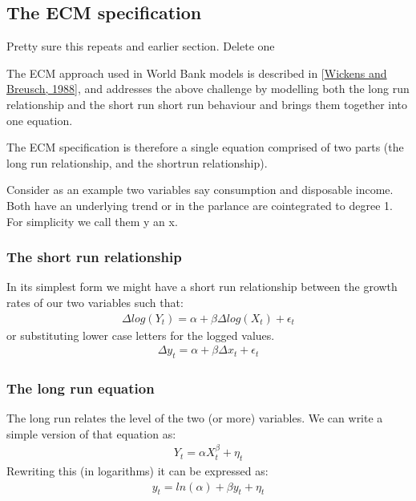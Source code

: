 \documentclass[letterpaper,10pt,english]{jupyterBook}
\begin{document}
\subsection{The ECM specification}
\label{\detokenize{content/06_WBModels/LoadingWBModel:the-ecm-specification}}
\sphinxAtStartPar
 Pretty sure this repeats and earlier section.  Delete one 

\sphinxAtStartPar
The ECM approach used in World Bank models is described in {[}\hyperlink{cite.content/99_BackMatter/References:id16}{Wickens and Breusch, 1988}{]}, and addresses the above challenge by modelling both the long run relationship and the short run short run behaviour and brings them together into one equation.

\sphinxAtStartPar
The ECM specification is therefore a single equation comprised of two parts (the long run relationship, and the short\sphinxhyphen{}run relationship).

\sphinxAtStartPar
Consider as an example two variables say consumption and disposable income.  Both have an underlying trend or in the parlance are co\sphinxhyphen{}integrated to degree 1.  For simplicity we call them y an x.


\subsubsection{The short run relationship}
\label{\detokenize{content/06_WBModels/LoadingWBModel:the-short-run-relationship}}
\sphinxAtStartPar
In its simplest form we might have a short run relationship between the growth rates of our two variables such that:
\begin{equation*}
\begin{split}\Delta log(Y_t) = \alpha + \beta \Delta log(X_t) +\epsilon_t\end{split}
\end{equation*}
\sphinxAtStartPar
or substituting lower case letters for the logged values.
\begin{equation*}
\begin{split}\Delta y_t = \alpha + \beta \Delta x_t +\epsilon_t\end{split}
\end{equation*}

\subsubsection{The long run equation}
\label{\detokenize{content/06_WBModels/LoadingWBModel:the-long-run-equation}}
\sphinxAtStartPar
The long run relates the level of the two (or more) variables.  We can write a simple version of that equation as:
\begin{equation*}
\begin{split}Y_t=αX_t^β+ \eta_t\end{split}
\end{equation*}
\sphinxAtStartPar
Rewriting this (in logarithms) it can be expressed as:
\begin{equation*}
\begin{split}y_t = ln⁡(α) + βy_t + \eta_t\end{split}
\end{equation*}
\end{document}
